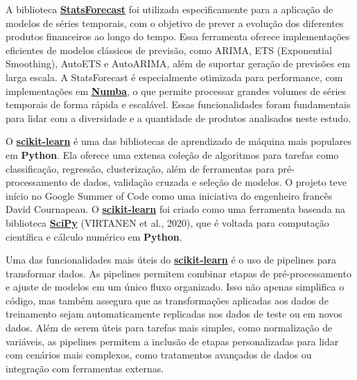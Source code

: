 \documentclass[
  12pt,
  a4paper,
]{scrreprt}
\begin{document}
\vspace{12pt}

A biblioteca
\href{https://nixtlaverse.nixtla.io/statsforecast/index.html}{\textbf{StatsForecast}}
foi utilizada especificamente para a aplicação de modelos de séries
temporais, com o objetivo de prever a evolução dos diferentes produtos
financeiros ao longo do tempo. Essa ferramenta oferece implementações
eficientes de modelos clássicos de previsão, como ARIMA, ETS
(Exponential Smoothing), AutoETS e AutoARIMA, além de suportar geração
de previsões em larga escala. A StatsForecast é especialmente otimizada
para performance, com implementações em
\href{https://numba.pydata.org/}{\textbf{Numba}}, o que permite
processar grandes volumes de séries temporais de forma rápida e
escalável. Essas funcionalidades foram fundamentais para lidar com a
diversidade e a quantidade de produtos analisados neste estudo.

\vspace{12pt}

O \href{https://scikit-learn.org/stable/}{\textbf{scikit-learn}} é uma
das bibliotecas de aprendizado de máquina mais populares em
\textbf{Python}. Ela oferece uma extensa coleção de algoritmos para
tarefas como classificação, regressão, clusterização, além de
ferramentas para pré-processamento de dados, validação cruzada e seleção
de modelos. O projeto teve início no Google Summer of Code como uma
iniciativa do engenheiro francês David Cournapeau. O
\href{https://scikit-learn.org/stable/}{\textbf{scikit-learn}} foi
criado como uma ferramenta baseada na biblioteca
\href{https://scipy.org/}{\textbf{SciPy}} (VIRTANEN et al., 2020), que é
voltada para computação científica e cálculo numérico em
\textbf{Python}.

\vspace{12pt}

Uma das funcionalidades mais úteis do
\href{https://scikit-learn.org/stable/}{\textbf{scikit-learn}} é o uso
de pipelines para transformar dados. As pipelines permitem combinar
etapas de pré-processamento e ajuste de modelos em um único fluxo
organizado. Isso não apenas simplifica o código, mas também assegura que
as transformações aplicadas aos dados de treinamento sejam
automaticamente replicadas nos dados de teste ou em novos dados. Além de
serem úteis para tarefas mais simples, como normalização de variáveis,
as pipelines permitem a inclusão de etapas personalizadas para lidar com
cenários mais complexos, como tratamentos avançados de dados ou
integração com ferramentas externas.
\end{document}
